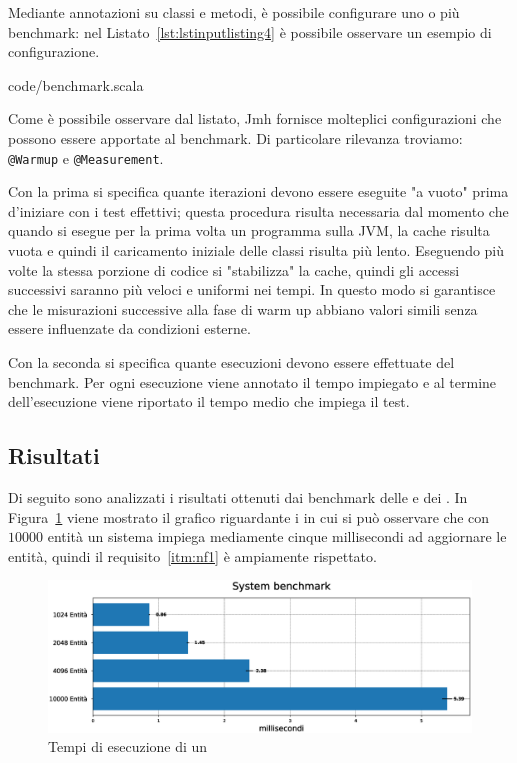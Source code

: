 Mediante annotazioni su classi e metodi, è possibile configurare uno o più benchmark: nel
Listato~\ref{lst:lstinputlisting4} è possibile osservare un esempio di configurazione.


{code/benchmark.scala}

Come è possibile osservare dal listato, Jmh fornisce molteplici configurazioni che possono essere apportate al
benchmark.
Di particolare rilevanza troviamo: \texttt{@Warmup} e \texttt{@Measurement}.

Con la prima si specifica quante iterazioni devono essere eseguite "a vuoto" prima d'iniziare con i test effettivi;
questa procedura risulta necessaria dal momento che quando si esegue per la prima volta un programma sulla JVM, la cache
risulta vuota e quindi il caricamento iniziale delle classi risulta più lento.
Eseguendo più volte la stessa porzione di codice si "stabilizza" la cache, quindi gli accessi successivi saranno più
veloci e uniformi nei tempi.
In questo modo si garantisce che le misurazioni successive alla fase di warm up abbiano valori simili senza essere
influenzate da condizioni esterne.

Con la seconda si specifica quante esecuzioni devono essere effettuate del benchmark.
Per ogni esecuzione viene annotato il tempo impiegato e al termine dell'esecuzione viene riportato il tempo medio che
impiega il test.

\subsection{Risultati}\label{subsec:risultati}
Di seguito sono analizzati i risultati ottenuti dai benchmark delle \View e dei \System.
In Figura~\ref{fig:system} viene mostrato il grafico riguardante i \System in cui si può osservare che con $10000$
entità un sistema impiega mediamente cinque millisecondi ad aggiornare le entità, quindi il requisito~\ref{itm:nf1} è
ampiamente rispettato.

\begin{figure}[H]
    \centering
    \includegraphics[width=\textwidth]{./img/system-benchmark}
    \caption{Tempi di esecuzione di un \System}\label{fig:system}
\end{figure}


